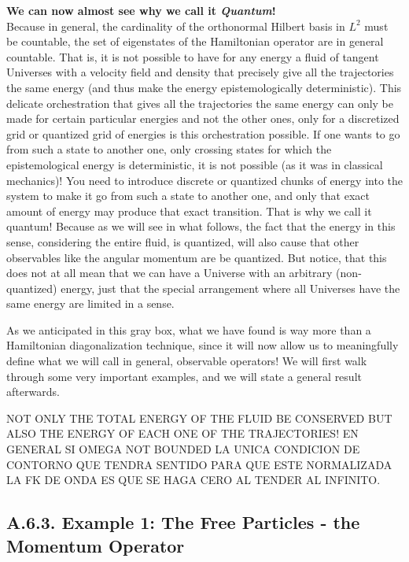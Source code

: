 \documentclass[11pt, a4paper]{article} %
\DeclareRobustCommand{\mybox}[2][gray!10]{%
\begin{tcolorbox}[   %
        left=0.2cm,
        right=0.2cm,
        top=0.15cm,
        bottom=0.15cm,
        colback=#1,
        colframe=#1,
        width=\dimexpr\textwidth\relax, 
        enlarge left by=0mm,
        boxsep=5pt,
        arc=0pt,outer arc=0pt,
        ]
        #2
\end{tcolorbox}
}
\begin{document}
\mybox{
{\bf We can now almost see why we call it {\em Quantum}!\\ }
Because in general, the cardinality of the orthonormal Hilbert basis in $L^2$ must be countable, the set of eigenstates of the Hamiltonian operator are in general countable. That is, it is not possible to have for any energy a fluid of tangent Universes with a velocity field and density that precisely give all the trajectories the same energy (and thus make the energy epistemologically deterministic). This delicate orchestration that gives all the trajectories the same energy can only be made for certain particular energies and not the other ones, only for a discretized grid or quantized grid of energies is this orchestration possible. If one wants to go from such a state to another one, only crossing states for which the epistemological energy is deterministic, it is not possible (as it was in classical mechanics)! You need to introduce discrete or quantized chunks of energy into the system to make it go from such a state to another one, and only that exact amount of energy may produce that exact transition. That is why we call it quantum! Because as we will see in what follows, the fact that the energy in this sense, considering the entire fluid, is quantized, will also cause that other observables like the angular momentum are be quantized. But notice, that this does not at all mean that we can have a Universe with an arbitrary (non-quantized) energy, just that the special arrangement where all Universes have the same energy are limited in a sense.
}



As we anticipated in this gray box, what we have found is way more than a Hamiltonian diagonalization technique, since it will now allow us to meaningfully define what we will call in general, observable operators! We will first walk through some very important examples, and we will state a general result afterwards.

NOT ONLY THE TOTAL ENERGY OF THE FLUID BE CONSERVED BUT ALSO THE ENERGY OF EACH ONE OF THE TRAJECTORIES!
EN GENERAL SI OMEGA NOT BOUNDED LA UNICA CONDICION DE CONTORNO QUE TENDRA SENTIDO PARA QUE ESTE NORMALIZADA LA FK DE ONDA ES QUE SE HAGA CERO AL TENDER AL INFINITO.

\subsection*{A.6.3. Example 1: The Free Particles - the Momentum Operator}
\end{document}
